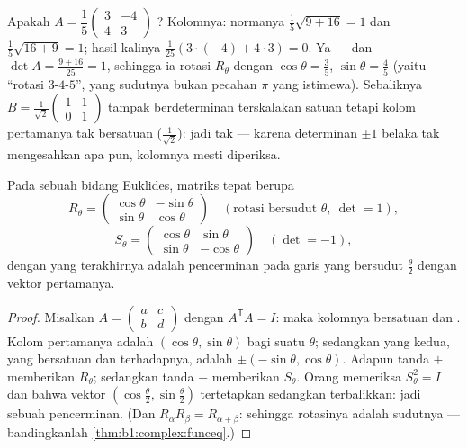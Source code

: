 \begin{example}
\label{ex:b1:euclid:recognize}
Apakah $A = \dfrac15\begin{pmatrix} 3 & -4\\ 4 & 3\end{pmatrix}$
? Kolomnya: normanya $\frac15\sqrt{9 + 16} = 1$ dan
$\frac15\sqrt{16 + 9} = 1$; hasil kalinya $\frac1{25}(3\cdot(-4) +
4\cdot3) = 0$. Ya --- dan $\det A = \frac{9 + 16}{25} = 1$, sehingga
ia rotasi $R_\theta$ dengan $\cos\theta = \frac35$,
$\sin\theta = \frac45$ (yaitu ``rotasi $3$-$4$-$5$'', yang
sudutnya bukan pecahan $\pi$ yang istimewa). Sebaliknya $B =
\frac{1}{\sqrt2}\begin{pmatrix} 1 & 1\\ 0 & 1\end{pmatrix}$
tampak berdeterminan terskalakan satuan tetapi kolom pertamanya tak bersatuan
($\frac1{\sqrt2}$): jadi tak  --- karena determinan $\pm1$ belaka
tak mengesahkan apa pun, kolomnya mesti diperiksa.
\end{example}

\begin{theorem}\label{thm:b1:euclid:plane}
Pada   sebuah bidang Euklides, matriks
 tepat berupa
\[
R_\theta = \begin{pmatrix}
\cos\theta & -\sin\theta\\ \sin\theta & \cos\theta
\end{pmatrix}
\quad (\text{rotasi bersudut } \theta,\ \det = 1),
\]
\[
S_\theta = \begin{pmatrix}
\cos\theta & \sin\theta\\ \sin\theta & -\cos\theta
\end{pmatrix}
\quad (\det = -1),
\]
dengan yang terakhirnya adalah pencerminan pada garis yang bersudut
$\frac\theta2$ dengan vektor  pertamanya.
\end{theorem}

\begin{proof}
Misalkan $A = \begin{pmatrix} a & c\\ b & d\end{pmatrix}$ dengan
$A^{\mathsf T}A = I$: maka kolomnya bersatuan dan . Kolom
pertamanya adalah $(\cos\theta, \sin\theta)$ bagi suatu $\theta$; sedangkan yang kedua,
yang bersatuan dan  terhadapnya, adalah $\pm(-\sin\theta, \cos\theta)$. Adapun
tanda $+$ memberikan $R_\theta$; sedangkan tanda $-$ memberikan $S_\theta$. Orang memeriksa
$S_\theta^2 = I$ dan bahwa vektor $(\cos\frac\theta2,
\sin\frac\theta2)$ tertetapkan sedangkan  terbalikkan: jadi sebuah
pencerminan. (Dan $R_\alpha R_\beta = R_{\alpha+\beta}$: sehingga 
rotasinya adalah  sudutnya --- bandingkanlah
\cref{thm:b1:complex:funceq}.)
\end{proof}

